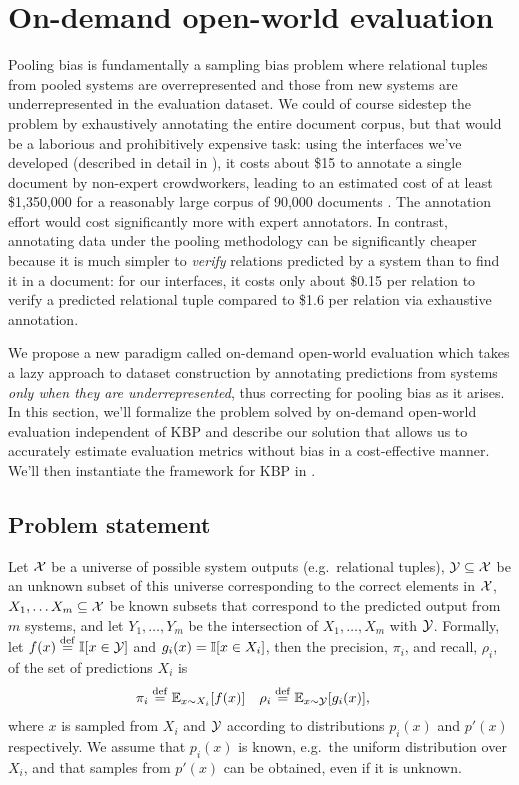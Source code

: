 \section{On-demand open-world evaluation}
\label{sec:method}

Pooling bias is fundamentally a sampling bias problem where relational tuples from pooled systems are overrepresented and those from new systems are underrepresented in the evaluation dataset.
We could of course sidestep the problem by exhaustively annotating the entire document corpus, but that would be a laborious and prohibitively expensive task:
using the interfaces we've developed (described in detail in ), it costs about \$15 to annotate a single document by non-expert crowdworkers, leading to an estimated cost of at least \$1,350,000 for a reasonably large corpus of 90,000 documents \cite{}.
The annotation effort would cost significantly more with expert annotators.
In contrast, annotating data under the pooling methodology can be significantly cheaper because it is much simpler to \textit{verify} relations predicted by a system than to find it in a document: for our interfaces, it costs only about \$0.15 per relation to verify a predicted relational tuple compared to \$1.6 per relation via exhaustive annotation. 

We propose a new paradigm called on-demand open-world evaluation which takes a lazy approach to dataset construction by annotating predictions from systems \textit{only when they are underrepresented}, thus correcting for pooling bias as it arises.
In this section, we'll formalize the problem solved by on-demand open-world evaluation independent of KBP and describe our solution that allows us to accurately estimate evaluation metrics without bias in a cost-effective manner. 
We'll then instantiate the framework for KBP in .

\subsection{Problem statement}
Let $\mathcal{X}$ be a universe of possible system outputs (e.g.\ relational tuples),
  $\mathcal{Y} \subseteq \mathcal{X}$ be an unknown subset of this universe corresponding to the correct elements in $\mathcal{X}$,
  $X_1, \ldots X_m \subseteq \mathcal{X}$ be known subsets that correspond to the predicted output from $m$ systems,
  and let $Y_1, \ldots, Y_m$ be the intersection of $X_1, \ldots, X_m$ with $\mathcal{Y}$.
Formally, let $f(x) \stackrel{\rm def}{=} \mathbb{I}[x \in \mathcal{Y}]$ and $g_i(x) = \mathbb{I}[x \in X_i]$, then the precision, $\pi_i$, and recall, $\rho_i$, of the set of predictions $X_i$ is
\begin{align*}
  \pi_i  &\stackrel{\rm def}{=} \mathbb{E}_{x \sim X_i}[f(x)] &
  \rho_i &\stackrel{\rm def}{=} \mathbb{E}_{x \sim \mathcal{Y}}[g_i(x)],
\end{align*}
where $x$ is sampled from $X_i$ and $\mathcal{Y}$ according to distributions $p_i(x)$ and $p'(x)$ respectively.
We assume that $p_i(x)$ is known, e.g.\ the uniform distribution over $X_i$, and that samples from $p'(x)$ can be obtained, even if it is unknown.

